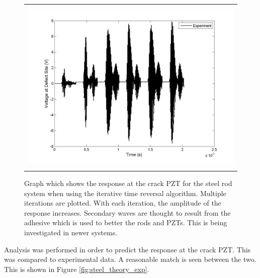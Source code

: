 \documentclass[a4paper]{spie}  %
\begin{document}
\begin{figure}[h!]
\begin{center}
\begin{tabular}{c}
\includegraphics[height=8.5cm]{steel_tr}
\end{tabular}
\end{center}
\caption[example] 
 { \label{fig:steel_tr} 
   Graph which shows the response at the crack PZT for the steel rod system when using the iterative time reversal algorithm. Multiple iterations are plotted. With each iteration, the amplitude of the response increases. Secondary waves are thought to result from the adhesive which is used to better the rods and PZTs. This is being investigated in newer systems.
}
\end{figure} 
   
Analysis was performed in order to predict the response at the crack PZT. This was compared to experimental data. A reasonable match is seen between the two. This is shown in Figure \ref{fig:steel_theory_exp}.
\end{document}
